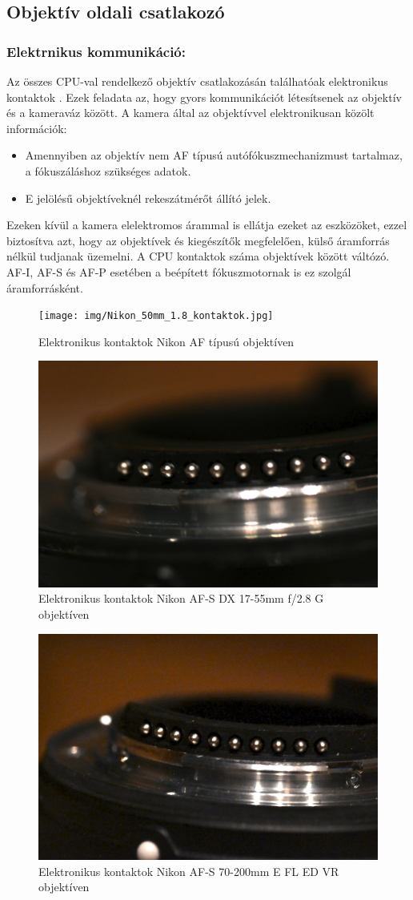\subsection{Objektív oldali csatlakozó}

\subsubsection{Elektrnikus kommunikáció:}
Az összes CPU-val rendelkező objektív csatlakozásán találhatóak elektronikus kontaktok \cite{Nikon_CPU}. Ezek feladata az, hogy gyors kommunikációt létesítsenek az objektív és a kameraváz között.
A kamera által az objektívvel elektronikusan közölt információk:
\begin{itemize}
    \item Amennyiben az objektív nem AF típusú autófókuszmechanizmust tartalmaz, a fókuszáláshoz szükséges adatok.
    \item E jelölésű objektíveknél rekeszátmérőt állító jelek.
\end{itemize}
Ezeken kívül a kamera elelektromos árammal is ellátja ezeket az eszközöket, ezzel biztosítva azt, hogy az objektívek és kiegészítők megfelelően, külső áramforrás nélkül tudjanak üzemelni. A CPU kontaktok száma objektívek között váltózó.\cite{Nikon_CPU} AF-I, AF-S és AF-P esetében a beépített fókuszmotornak is ez szolgál áramforrásként.

\begin{figure}[H]
	\centering
	\texttt{[image: img/Nikon\_50mm\_1.8\_kontaktok.jpg]}
	\caption{Elektronikus kontaktok Nikon AF típusú objektíven}
	\label{fig:AF_kontakt}
\end{figure}

\begin{figure}[H]
	\centering
	\includegraphics[width=0.5\linewidth]{img/Nikon_17-55_kontaktok.jpg}
	\caption{Elektronikus kontaktok Nikon AF-S DX 17-55mm f/2.8 G objektíven}
	\label{fig:G_kontakt}
\end{figure}

\begin{figure}[H]
	\centering
	\includegraphics[width=0.5\linewidth]{img/Nikon_70-200E_kontaktok.jpg}
	\caption{Elektronikus kontaktok Nikon AF-S 70-200mm E FL ED VR objektíven}
	\label{fig:E_kontakt}
\end{figure}

